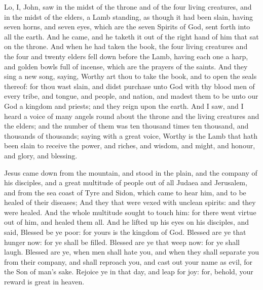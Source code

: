  Lo, I, John, saw in the midst of the throne and of the four living creatures, and in the midst of the elders, a Lamb standing, as though it had been slain, having seven horns, and seven eyes, which are the seven Spirits of God, sent forth into all the earth. And he came, and he taketh it out of the right hand of him that sat on the throne. And when he had taken the book, the four living creatures and the four and twenty elders fell down before the Lamb, having each one a harp, and golden bowls full of incense, which are the prayers of the saints. And they sing a new song, saying, Worthy art thou to take the book, and to open the seals thereof: for thou wast slain, and didst purchase unto God with thy blood men of every tribe, and tongue, and people, and nation,  and madest them to be unto our God a kingdom and priests; and they reign upon the earth. And I saw, and I heard a voice of many angels round about the throne and the living creatures and the elders; and the number of them was ten thousand times ten thousand, and thousands of thousands; saying with a great voice, Worthy is the Lamb that hath been slain to receive the power, and riches, and wisdom, and might, and honour, and glory, and blessing. 


 Jesus came down from the mountain, and stood in the plain, and the company of his disciples, and a great multitude of people out of all Judaea and Jerusalem, and from the sea coast of Tyre and Sidon, which came to hear him, and to be healed of their diseases; And they that were vexed with unclean spirits: and they were healed. And the whole multitude sought to touch him: for there went virtue out of him, and healed them all. And he lifted up his eyes on his disciples, and said, Blessed be ye poor: for yours is the kingdom of God. Blessed are ye that hunger now: for ye shall be filled. Blessed are ye that weep now: for ye shall laugh. Blessed are ye, when men shall hate you, and when they shall separate you from their company, and shall reproach you, and cast out your name as evil, for the Son of man's sake. Rejoice ye in that day, and leap for joy: for, behold, your reward is great in heaven.


